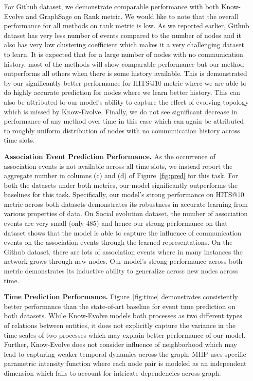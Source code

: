 \documentclass[11pt]{article}
\begin{document}
For Github dataset, we demonstrate comparable performance with both Know-Evolve and GraphSage on Rank metric. We would like to note that the overall performance for all methods on rank metric is low. As we reported earlier, Github dataset has very less number of events compared to the number of nodes and it also has very low clustering coefficient which makes it a very challenging dataset to learn. %
It is expected that for a large number of nodes with no communication history, most of the methods will show comparable performance but our method outperforms all others when there is some history available. This is demonstrated by our significantly better performance for HITS@10 metric where we are able to do highly accurate prediction for nodes where we learn better history. This can also be attributed to our model's ability to capture the effect of evolving topology which is missed by Know-Evolve. Finally, we do not see significant decrease in performance of any method over time in this case which can again be attributed to roughly uniform distribution of nodes with no communication history across time slots.

\textbf{Association Event Prediction Performance.} As the occurrence of association events is not available across all time slots, we instead report the aggregate number in columns (c) and (d) of Figure~\ref{fig:pred} for this task. For both the datasets under both metrics, our model significantly outperforms the baselines for this task. Specifically, our model's strong performance on HITS@10 metric across both datasets demonstrates its robustness in accurate learning from various properties of data. On Social evolution dataset, the number of association events are very small (only 485) and hence our strong performance on that dataset shows that the model is able to capture the influence of communication events on the association events through the learned representations. On the Github dataset, there are lots of association events where in many instances the network grows through new nodes. Our model's strong performance across both metric demonstrates its inductive ability to generalize across new nodes across time.

\textbf{Time Prediction Performance.} Figure~\ref{fig:time} demonstrates consistently better performance than the state-of-art baseline for event time prediction on both datasets. While Know-Evolve models both processes as two different types of relations between entities, it does not explicitly capture the variance in the time scales of two processes which may explain better performance of our model. Further, Know-Evolve does not consider influence of neighborhood which may lead to capturing weaker temporal dynamics across the graph. MHP uses specific parametric intensity function where each node pair is modeled as an independent dimension which fails to account for intricate dependencies across graph.
\end{document}

